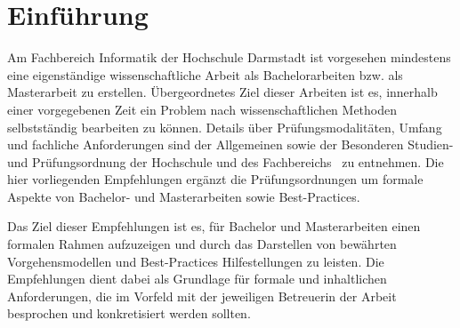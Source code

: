 \section{Einführung}\label{sec:introduction}
%
Am Fachbereich Informatik der Hochschule Darmstadt ist vorgesehen mindestens eine eigenständige wissenschaftliche Arbeit als Bachelorarbeiten bzw. als Masterarbeit zu erstellen. Übergeordnetes Ziel dieser Arbeiten ist es, innerhalb einer vorgegebenen Zeit ein Problem nach wissenschaftlichen Methoden selbstständig bearbeiten zu können. Details über Prüfungsmodalitäten, Umfang und fachliche Anforderungen sind der Allgemeinen sowie der Besonderen Studien- und Prüfungsordnung der Hochschule und des Fachbereichs~\cite{hda:2012:01, fbi:2014:01} zu entnehmen. Die hier vorliegenden Empfehlungen ergänzt die Prüfungsordnungen um formale Aspekte von Bachelor- und Masterarbeiten sowie Best-Practices.

Das Ziel dieser Empfehlungen ist es, für Bachelor und Masterarbeiten einen formalen Rahmen aufzuzeigen und durch das Darstellen von bewährten Vorgehensmodellen und Best-Practices Hilfestellungen zu leisten. Die Empfehlungen dient dabei als Grundlage für formale und inhaltlichen Anforderungen, die im Vorfeld mit der jeweiligen Betreuerin der Arbeit besprochen und konkretisiert werden sollten.

